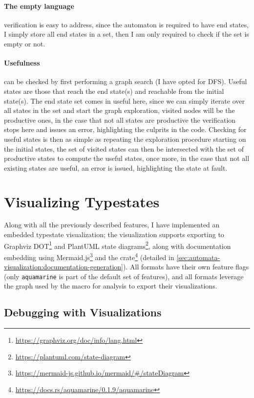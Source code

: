 \paragraph{The empty language} verification is easy to address, since the automaton is required to have end states,
I simply store all end states in a set, then I am only required to check if the set is empty or not.

\paragraph{Usefulness} can be checked by first performing a graph search (I have opted for \gls{DFS}).
Useful states are those that reach the end state(s)  and reachable from the initial state(s).
The end state set comes in useful here, since we can simply iterate over all states in the set and start the graph exploration,
visited nodes will be the productive ones, in the case that not all states are productive the verification stops here and issues an error,
highlighting the culprits in the code.
Checking for useful states is then as simple as repeating the exploration procedure starting on the initial states,
the set of visited states can then be intersected with the set of productive states to compute the useful states,
once more, in the case that not all existing states are useful, an error is issued, highlighting the state at fault.


\section{Visualizing Typestates}\label{sec:automata-visualization}

Along with all the previously described features, I have implemented an embedded typestate visualization;
the visualization supports exporting to Graphviz DOT\footnote{\url{https://graphviz.org/doc/info/lang.html}} and
PlantUML state diagrams\footnote{\url{https://plantuml.com/state-diagram}},
along with documentation embedding using Mermaid.js\footnote{\url{https://mermaid-js.github.io/mermaid/\#/stateDiagram}}
and the  crate\footnote{\url{https://docs.rs/aquamarine/0.1.9/aquamarine}} (detailed in \autoref{sec:automata-visualization:documentation-generation}).
All formats have their own feature flags (only \texttt{aquamarine} is part of the default set of features),
and all formats leverage the graph used by the macro for analysis to export their visualizations.

\subsection{Debugging with Visualizations}

